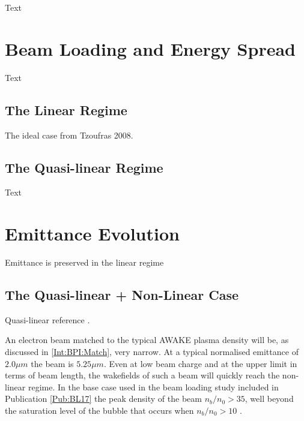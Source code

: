 Text


\section{Beam Loading and Energy Spread}
\label{Sim:BLoad}

Text


\subsection{The Linear Regime}
\label{Sim:Lin}

The ideal case from Tzoufras 2008.


\subsection{The Quasi-linear Regime}
\label{Sim:QLin}

Text


\section{Emittance Evolution}
\label{Sim:Emitt}

Emittance is preserved in the linear regime


\subsection{The Quasi-linear + Non-Linear Case}
\label{Sim:QLinNonLin}

Quasi-linear reference \cite{rosenzweig:2010}.

An electron beam matched to the typical AWAKE plasma density will be, as discussed in \ref{Int:BPI:Match}, very narrow. At a typical normalised emittance of $2.0\unit{\mu m}$ the beam is $5.25\unit{\mu m}$. Even at low beam charge and at the upper limit in terms of beam length, the wakefields of such a beam will quickly reach the non-linear regime. In the base case used in the beam loading study included in Publication \ref{Pub:BL17} \cite{berglyd_olsen:2018} the peak density of the beam $n_b/n_0 > 35$, well beyond the saturation level of the bubble that occurs when $n_b/n_0 > 10$ \cite{lu:2005}.

